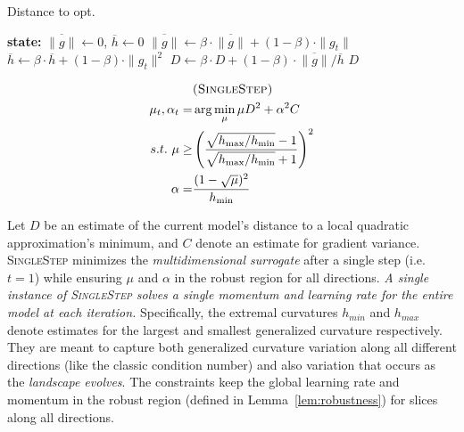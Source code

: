 \begin{table*}[t]
\begin{minipage}{0.3\textwidth}
	\begin{algorithm}[H]
	\small
	\caption{\small Distance to opt.}
	\begin{algorithmic}
	\State \textbf{state: } $\overline{\|g\|}\gets0$, $\overline{h}\gets0$
		\State $\overline{\|g\|}\gets \beta \cdot \overline{\|g\|} + (1 - \beta) \cdot \|g_t\|$
		\State $\overline{h} \gets \beta \cdot \overline{h} + (1 - \beta) \cdot \| g_t \|^2$
		\State $D \gets \beta \cdot D + (1 - \beta) \cdot \overline{\|g\|} /\overline{h}$
		\Return $D$
	\EndFunction
	\end{algorithmic}
	\label{alg:dist_func}
	\end{algorithm}
\end{minipage}
\end{table*}

\begin{wrapfigure}[9]{R}{0.55\linewidth}
\vspace{-2.5em}
\hspace{-1em}
\begin{minipage}{\linewidth}
	\begin{equation}
	\begin{aligned}
	&\textsc{(SingleStep)} \\
	 \mu_t, \alpha_t = & \arg \min_{\mu} \mu D^2
		+ \alpha^2 C \\
	s.t.\  \mu \geq & \left(\frac{\sqrt{h_{\max}/h_{\min} }-1}{\sqrt{h_{\max}/h_{\min}}+1}\right)^2 \\
	\alpha =& \frac{(1-\sqrt{\mu})^2}{h_{\min}}
	\end{aligned}
	\label{equ:noisy_min}
	\end{equation}
\end{minipage}
\end{wrapfigure}
Let $D$ be an estimate of the current model's distance to a local quadratic approximation's minimum, and $C$ denote an estimate for gradient variance.
\textsc{SingleStep} minimizes the \emph{multidimensional surrogate} after a single step (i.e. $t=1$) while ensuring $\mu$ and $\alpha$ in the robust region for all directions. \emph{A single instance of \textsc{SingleStep} solves a single momentum and learning rate for the entire model at each iteration.}
Specifically, the extremal curvatures $h_{min}$ and $h_{max}$ denote estimates for the largest and smallest generalized curvature respectively. They are meant to capture both generalized curvature variation along all different directions (like the classic condition number)
and also variation that occurs as the {\em landscape evolves}. The constraints keep the global learning rate and momentum in the robust region (defined in Lemma~\ref{lem:robustness}) 
for slices along all directions.

